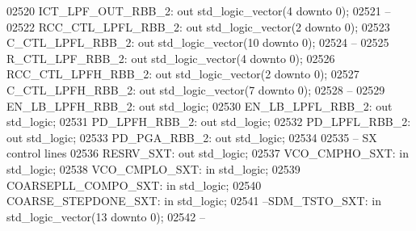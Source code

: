 \begin{DoxyCode}
02520     ICT\_LPF\_OUT\_RBB\_2:  \textcolor{keywordflow}{out} \textcolor{comment}{std\_logic\_vector}(\textcolor{vhdllogic}{}\textcolor{vhdllogic}{4} \textcolor{keywordflow}{downto} \textcolor{vhdllogic}{}\textcolor{vhdllogic}{0});
02521 \textcolor{keyword}{    --}
02522     RCC\_CTL\_LPFL\_RBB\_2: \textcolor{keywordflow}{out} \textcolor{comment}{std\_logic\_vector}(\textcolor{vhdllogic}{}\textcolor{vhdllogic}{2} \textcolor{keywordflow}{downto} \textcolor{vhdllogic}{}\textcolor{vhdllogic}{0});
02523     C\_CTL\_LPFL\_RBB\_2:   \textcolor{keywordflow}{out} \textcolor{comment}{std\_logic\_vector}(\textcolor{vhdllogic}{}\textcolor{vhdllogic}{10} \textcolor{keywordflow}{downto} \textcolor{vhdllogic}{}\textcolor{vhdllogic}{0});
02524 \textcolor{keyword}{    --}
02525     R\_CTL\_LPF\_RBB\_2:    \textcolor{keywordflow}{out} \textcolor{comment}{std\_logic\_vector}(\textcolor{vhdllogic}{}\textcolor{vhdllogic}{4} \textcolor{keywordflow}{downto} \textcolor{vhdllogic}{}\textcolor{vhdllogic}{0});
02526     RCC\_CTL\_LPFH\_RBB\_2: \textcolor{keywordflow}{out} \textcolor{comment}{std\_logic\_vector}(\textcolor{vhdllogic}{}\textcolor{vhdllogic}{2} \textcolor{keywordflow}{downto} \textcolor{vhdllogic}{}\textcolor{vhdllogic}{0});
02527     C\_CTL\_LPFH\_RBB\_2:   \textcolor{keywordflow}{out} \textcolor{comment}{std\_logic\_vector}(\textcolor{vhdllogic}{}\textcolor{vhdllogic}{7} \textcolor{keywordflow}{downto} \textcolor{vhdllogic}{}\textcolor{vhdllogic}{0});
02528 \textcolor{keyword}{    --}
02529     EN\_LB\_LPFH\_RBB\_2:   \textcolor{keywordflow}{out} \textcolor{comment}{std\_logic};
02530     EN\_LB\_LPFL\_RBB\_2:   \textcolor{keywordflow}{out} \textcolor{comment}{std\_logic};
02531     PD\_LPFH\_RBB\_2:  \textcolor{keywordflow}{out} \textcolor{comment}{std\_logic};
02532     PD\_LPFL\_RBB\_2:  \textcolor{keywordflow}{out} \textcolor{comment}{std\_logic};
02533     PD\_PGA\_RBB\_2:   \textcolor{keywordflow}{out} \textcolor{comment}{std\_logic};
02534 
02535 \textcolor{keyword}{    -- SX control lines }
02536     RESRV\_SXT:  \textcolor{keywordflow}{out} \textcolor{comment}{std\_logic};
02537     VCO\_CMPHO\_SXT:      \textcolor{keywordflow}{in} \textcolor{comment}{std\_logic};
02538     VCO\_CMPLO\_SXT:      \textcolor{keywordflow}{in} \textcolor{comment}{std\_logic};
02539     COARSEPLL\_COMPO\_SXT:    \textcolor{keywordflow}{in} \textcolor{comment}{std\_logic};
02540     COARSE\_STEPDONE\_SXT:    \textcolor{keywordflow}{in} \textcolor{comment}{std\_logic};
02541 \textcolor{keyword}{    --SDM\_TSTO\_SXT: in std\_logic\_vector(13 downto 0);}
02542 \textcolor{keyword}{    --}

\end{DoxyCode}
